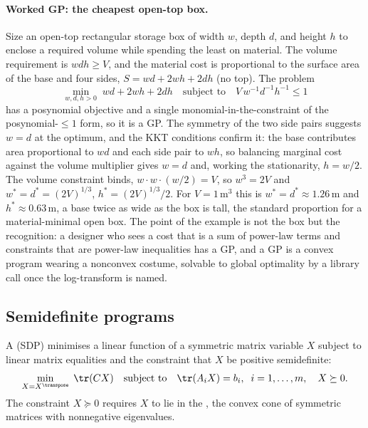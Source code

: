 \paragraph{Worked GP: the cheapest open-top box.}
Size an open-top rectangular storage box of width $w$, depth $d$, and
height $h$ to enclose a required volume while spending the least on
material. The volume requirement is $w d h \geq V$, and the material
cost is proportional to the surface area of the base and four sides,
$S = w d + 2 w h + 2 d h$ (no top). The problem
\[
\min_{w, d, h > 0} \; w d + 2 w h + 2 d h
\quad \text{subject to} \quad V\, w^{-1} d^{-1} h^{-1} \leq 1
\]
has a posynomial objective and a single monomial-in-the-constraint of
the posynomial-$\leq 1$ form, so it is a GP. The symmetry of the two
side pairs suggests $w = d$ at the optimum, and the KKT conditions
confirm it: the base contributes area proportional to $w d$ and each
side pair to $w h$, so balancing marginal cost against the volume
multiplier gives $w = d$ and, working the stationarity, $h = w/2$. The
volume constraint binds, $w \cdot w \cdot (w/2) = V$, so $w^{3} = 2V$
and $w^{*} = d^{*} = (2V)^{1/3}$, $h^{*} = (2V)^{1/3}/2$. For $V =
1\,\si{\cubic\meter}$ this is $w^{*} = d^{*} \approx 1.26\,\si{\meter}$
and $h^{*} \approx 0.63\,\si{\meter}$, a base twice as wide as the box
is tall, the standard proportion for a material-minimal open box. The
point of the example is not the box but the recognition: a designer who
sees a cost that is a sum of power-law terms and constraints that are
power-law inequalities has a GP, and a GP is a convex program wearing a
nonconvex costume, solvable to global optimality by a library call once
the log-transform is named.



\subsection{Semidefinite programs}

\begin{definition}
A  (SDP) minimises a linear function of
a symmetric matrix variable $X$ subject to linear matrix equalities and
the constraint that $X$ be positive semidefinite:
\[
\min_{X = X^{\transpose}} \; \tr(C X)
\quad \text{subject to} \quad
\tr(A_{i} X) = b_{i}, \;\; i = 1, \ldots, m, \quad X \succeq 0.
\]
The constraint $X \succeq 0$ requires $X$ to lie in the
, the convex cone of symmetric
matrices with nonnegative eigenvalues.
\end{definition}

